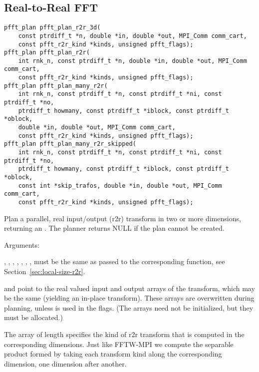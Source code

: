 \subsection{Real-to-Real FFT}
\begin{lstlisting}
pfft_plan pfft_plan_r2r_3d(
    const ptrdiff_t *n, double *in, double *out, MPI_Comm comm_cart,
    const pfft_r2r_kind *kinds, unsigned pfft_flags);
pfft_plan pfft_plan_r2r(
    int rnk_n, const ptrdiff_t *n, double *in, double *out, MPI_Comm comm_cart,
    const pfft_r2r_kind *kinds, unsigned pfft_flags);
pfft_plan pfft_plan_many_r2r(
    int rnk_n, const ptrdiff_t *n, const ptrdiff_t *ni, const ptrdiff_t *no,
    ptrdiff_t howmany, const ptrdiff_t *iblock, const ptrdiff_t *oblock,
    double *in, double *out, MPI_Comm comm_cart,
    const pfft_r2r_kind *kinds, unsigned pfft_flags);
pfft_plan pfft_plan_many_r2r_skipped(
    int rnk_n, const ptrdiff_t *n, const ptrdiff_t *ni, const ptrdiff_t *no,
    ptrdiff_t howmany, const ptrdiff_t *iblock, const ptrdiff_t *oblock,
    const int *skip_trafos, double *in, double *out, MPI_Comm comm_cart,
    const pfft_r2r_kind *kinds, unsigned pfft_flags);
\end{lstlisting}
Plan a parallel, real input/output (r2r) transform in two or more dimensions, returning an .
The planner returns NULL if the plan cannot be created.

Arguments:
\begin{compactitem}
  \item {}, , , , , , ,  must be the same as passed
        to the corresponding  function, see Section~\ref{sec:local-size-r2r}.
  \item {} and  point to the real valued input and output arrays of the transform, which may be the same (yielding an in-place transform).
        These arrays are overwritten during planning, unless  is used in the flags.
        (The arrays need not be initialized, but they must be allocated.)
  \item The array  of length  specifies the kind of r2r transform that is computed in the corresponding dimensions. 
        Just like FFTW-MPI we compute the separable product formed by taking each transform kind along the corresponding dimension, one dimension after another.
\end{compactitem}



